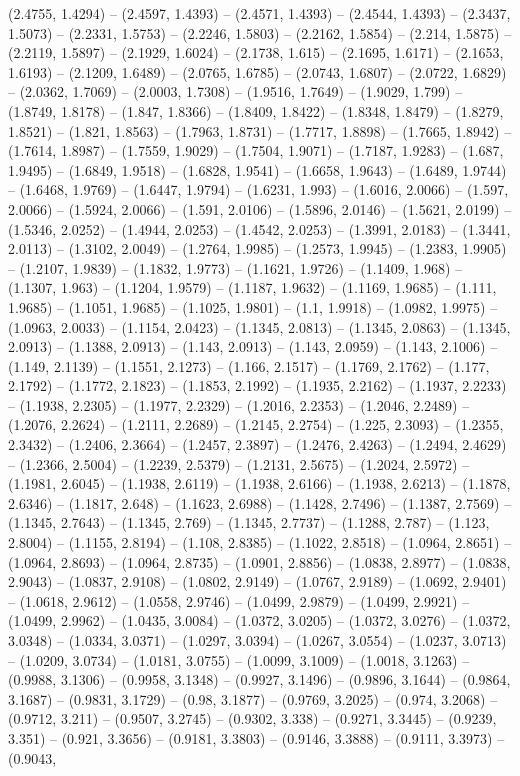 (2.4755, 1.4294) -- (2.4597, 1.4393) -- (2.4571, 1.4393) -- (2.4544, 1.4393) -- (2.3437, 1.5073) -- (2.2331, 1.5753) -- (2.2246, 1.5803) -- (2.2162, 1.5854) -- (2.214, 1.5875) -- (2.2119, 1.5897) -- (2.1929, 1.6024) -- (2.1738, 1.615) -- (2.1695, 1.6171) -- (2.1653, 1.6193) -- (2.1209, 1.6489) -- (2.0765, 1.6785) -- (2.0743, 1.6807) -- (2.0722, 1.6829) -- (2.0362, 1.7069) -- (2.0003, 1.7308) -- (1.9516, 1.7649) -- (1.9029, 1.799) -- (1.8749, 1.8178) -- (1.847, 1.8366) -- (1.8409, 1.8422) -- (1.8348, 1.8479) -- (1.8279, 1.8521) -- (1.821, 1.8563) -- (1.7963, 1.8731) -- (1.7717, 1.8898) -- (1.7665, 1.8942) -- (1.7614, 1.8987) -- (1.7559, 1.9029) -- (1.7504, 1.9071) -- (1.7187, 1.9283) -- (1.687, 1.9495) -- (1.6849, 1.9518) -- (1.6828, 1.9541) -- (1.6658, 1.9643) -- (1.6489, 1.9744) -- (1.6468, 1.9769) -- (1.6447, 1.9794) -- (1.6231, 1.993) -- (1.6016, 2.0066) -- (1.597, 2.0066) -- (1.5924, 2.0066) -- (1.591, 2.0106) -- (1.5896, 2.0146) -- (1.5621, 2.0199) -- (1.5346, 2.0252) -- (1.4944, 2.0253) -- (1.4542, 2.0253) -- (1.3991, 2.0183) -- (1.3441, 2.0113) -- (1.3102, 2.0049) -- (1.2764, 1.9985) -- (1.2573, 1.9945) -- (1.2383, 1.9905) -- (1.2107, 1.9839) -- (1.1832, 1.9773) -- (1.1621, 1.9726) -- (1.1409, 1.968) -- (1.1307, 1.963) -- (1.1204, 1.9579) -- (1.1187, 1.9632) -- (1.1169, 1.9685) -- (1.111, 1.9685) -- (1.1051, 1.9685) -- (1.1025, 1.9801) -- (1.1, 1.9918) -- (1.0982, 1.9975) -- (1.0963, 2.0033) -- (1.1154, 2.0423) -- (1.1345, 2.0813) -- (1.1345, 2.0863) -- (1.1345, 2.0913) -- (1.1388, 2.0913) -- (1.143, 2.0913) -- (1.143, 2.0959) -- (1.143, 2.1006) -- (1.149, 2.1139) -- (1.1551, 2.1273) -- (1.166, 2.1517) -- (1.1769, 2.1762) -- (1.177, 2.1792) -- (1.1772, 2.1823) -- (1.1853, 2.1992) -- (1.1935, 2.2162) -- (1.1937, 2.2233) -- (1.1938, 2.2305) -- (1.1977, 2.2329) -- (1.2016, 2.2353) -- (1.2046, 2.2489) -- (1.2076, 2.2624) -- (1.2111, 2.2689) -- (1.2145, 2.2754) -- (1.225, 2.3093) -- (1.2355, 2.3432) -- (1.2406, 2.3664) -- (1.2457, 2.3897) -- (1.2476, 2.4263) -- (1.2494, 2.4629) -- (1.2366, 2.5004) -- (1.2239, 2.5379) -- (1.2131, 2.5675) -- (1.2024, 2.5972) -- (1.1981, 2.6045) -- (1.1938, 2.6119) -- (1.1938, 2.6166) -- (1.1938, 2.6213) -- (1.1878, 2.6346) -- (1.1817, 2.648) -- (1.1623, 2.6988) -- (1.1428, 2.7496) -- (1.1387, 2.7569) -- (1.1345, 2.7643) -- (1.1345, 2.769) -- (1.1345, 2.7737) -- (1.1288, 2.787) -- (1.123, 2.8004) -- (1.1155, 2.8194) -- (1.108, 2.8385) -- (1.1022, 2.8518) -- (1.0964, 2.8651) -- (1.0964, 2.8693) -- (1.0964, 2.8735) -- (1.0901, 2.8856) -- (1.0838, 2.8977) -- (1.0838, 2.9043) -- (1.0837, 2.9108) -- (1.0802, 2.9149) -- (1.0767, 2.9189) -- (1.0692, 2.9401) -- (1.0618, 2.9612) -- (1.0558, 2.9746) -- (1.0499, 2.9879) -- (1.0499, 2.9921) -- (1.0499, 2.9962) -- (1.0435, 3.0084) -- (1.0372, 3.0205) -- (1.0372, 3.0276) -- (1.0372, 3.0348) -- (1.0334, 3.0371) -- (1.0297, 3.0394) -- (1.0267, 3.0554) -- (1.0237, 3.0713) -- (1.0209, 3.0734) -- (1.0181, 3.0755) -- (1.0099, 3.1009) -- (1.0018, 3.1263) -- (0.9988, 3.1306) -- (0.9958, 3.1348) -- (0.9927, 3.1496) -- (0.9896, 3.1644) -- (0.9864, 3.1687) -- (0.9831, 3.1729) -- (0.98, 3.1877) -- (0.9769, 3.2025) -- (0.974, 3.2068) -- (0.9712, 3.211) -- (0.9507, 3.2745) -- (0.9302, 3.338) -- (0.9271, 3.3445) -- (0.9239, 3.351) -- (0.921, 3.3656) -- (0.9181, 3.3803) -- (0.9146, 3.3888) -- (0.9111, 3.3973) -- (0.9043, 